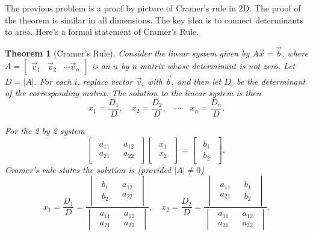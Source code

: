 \documentclass[letterpaper,oneside]{book}%
\theoremstyle{plain}
\newtheorem{theorem}{Theorem}[chapter]
\theoremstyle{box}
\theoremstyle{problem}
\newcommand{\nvec}[1]{\begin{matrix} #1 \end{matrix}}
\begin{document}
The previous problem is a proof by picture of Cramer's rule in 2D. The proof of the theorem is similar in all dimensions. The key idea is to connect determinants to area.  
Here's a formal statement of Cramer's Rule.
\begin{theorem}[Cramer's Rule]\label{Cramer's Rule}
 Consider the linear system given by $A\vec x = \vec b$, where 
$A=\begin{bmatrix}\vec v_1 &\vec v_2 &\cdots \vec v_n \end{bmatrix}$
is an $n$ by $n$ matrix whose determinant is not zero.  Let $D=|A|$. For each $i$, replace vector $\vec v_i$ with $\vec b$, and then let $D_i$ be the determinant of the corresponding matrix. The solution to the linear system is then 
$$x_1 = \frac{D_1}{D},\quad x_2 = \frac{D_2}{D},\quad \cdots \quad x_n = \frac{D_n}{D}.$$

For the 2 by 2 system
$$
\begin{bmatrix}\nvec{a_{11}\\a_{21}}&\nvec{a_{12}\\a_{22}} \end{bmatrix}
\begin{bmatrix}\nvec{x_{1}\\x_{2}} \end{bmatrix}
=
\begin{bmatrix}\nvec{b_{1}\\b_{2}} \end{bmatrix},
$$
Cramer's rule states the solution is (provided $|A|\neq 0$) 
$$
x_1 = \frac{D_1}{D}=\frac{\begin{vmatrix}\nvec{b_1\\b_2}&\nvec{a_{12}\\a_{22}} \end{vmatrix}}{\begin{vmatrix}\nvec{a_{11}\\a_{21}}&\nvec{a_{12}\\a_{22}} \end{vmatrix}},
\quad 
x_2 = \frac{D_2}{D}=\frac{\begin{vmatrix}\nvec{a_{11}\\a_{21}}&\nvec{b_1\\b_2}\end{vmatrix}}{\begin{vmatrix}\nvec{a_{11}\\a_{21}}&\nvec{a_{12}\\a_{22}} \end{vmatrix}}
.$$
\end{theorem}
\end{document}

